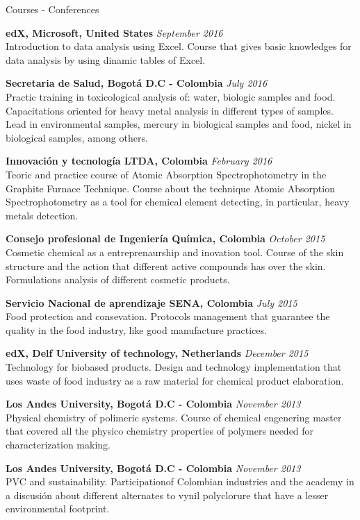 \documentclass[spanish]{resume}
\begin{document}
\begin{rSection}{Courses - Conferences}

{\bf edX, Microsoft, United States} \hfill {\em September 2016} \\
Introduction to data analysis using Excel.
Course that gives basic knowledges for data analysis by using dinamic tables of Excel.

{\bf Secretaria de Salud, Bogot\'a D.C - Colombia} \hfill {\em July 2016} \\
Practic training in toxicological analysis of: water, biologic samples and food.
Capacitations oriented for heavy metal analysis in different types of samples. Lead in environmental samples, mercury in biological samples and food, nickel in biological samples, among others.

{\bf Innovación y tecnología LTDA, Colombia} \hfill {\em February 2016} \\
Teoric and practice course of Atomic Absorption Spectrophotometry in the Graphite Furnace Technique.
Course about the technique Atomic Absorption Spectrophotometry as a tool for chemical element detecting, in particular, heavy metals detection.

{\bf Consejo profesional de Ingeniería Química, Colombia} \hfill {\em October 2015} \\
Cosmetic chemical as a entreprenaurship and inovation tool.
Course of the skin structure and the action that different active compounds has over the skin. Formulations analysis of different cosmetic products.

{\bf Servicio Nacional de aprendizaje SENA, Colombia} \hfill {\em July 2015} \\
Food protection and consevation.
Protocols management that guarantee the quality in the food industry, like good manufacture practices.

{\bf edX, Delf University of technology, Netherlands} \hfill {\em December 2015} \\
Technology for biobased products.
Design and technology implementation that uses waste of food industry as a raw material for chemical product elaboration.

{\bf Los Andes University, Bogot\'a D.C - Colombia} \hfill {\em November 2013} \\
Physical chemistry of polimeric systems. Course of chemical engenering master that covered all the physico chemistry properties of polymers needed for characterization making.

{\bf Los Andes University, Bogot\'a D.C - Colombia} \hfill {\em November 2013} \\
PVC and sustainability. Participationof Colombian industries and the academy in a discusión about different alternates to vynil polyclorure that have a lesser environmental footprint.
\end{rSection}
\end{document}
